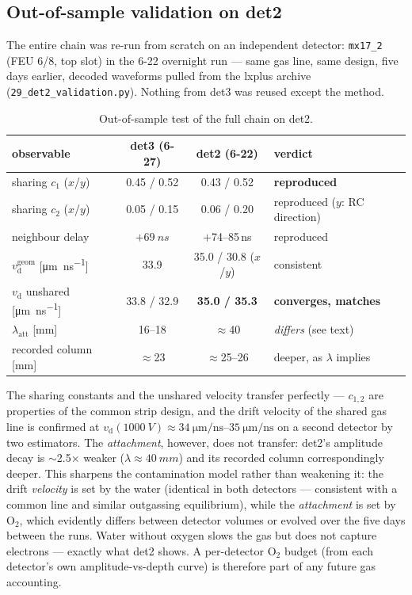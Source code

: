 \documentclass[11pt,a4paper]{article}
\newcommand{\vd}{v_{\mathrm{d}}}
\newcommand{\umns}{\micro\meter\per\nano\second}
\begin{document}
\subsection{Out-of-sample validation on det2}
\label{sec:det2val}

The entire chain was re-run from scratch on an independent detector:
\texttt{mx17\_2} (FEU 6/8, top slot) in the 6-22 overnight run --- same gas
line, same design, five days earlier, decoded waveforms pulled from the
lxplus archive (\texttt{29\_det2\_validation.py}).  Nothing from det3 was
reused except the method.

\begin{table}[H]
\centering\small
\begin{tabular}{lccl}
\toprule
observable & det3 (6-27) & det2 (6-22) & verdict \\
\midrule
sharing $c_1$ ($x$/$y$)      & 0.45 / 0.52 & 0.43 / 0.52 & \textbf{reproduced} \\
sharing $c_2$ ($x$/$y$)      & 0.05 / 0.15 & 0.06 / 0.20 & reproduced ($y$: RC direction) \\
neighbour delay              & $+\SI{69}{ns}$ & $+$74--85\,\si{ns} & reproduced \\
$\vd^{\mathrm{geom}}$ [\si{\umns}] & 33.9 & 35.0 / 30.8 ($x$/$y$) & consistent \\
$\vd$ unshared [\si{\umns}]  & 33.8 / 32.9 & \textbf{35.0 / 35.3} & \textbf{converges, matches} \\
$\lambda_{\mathrm{att}}$ [mm] & 16--18 & $\approx$40 & \emph{differs} (see text) \\
recorded column [mm]         & $\approx$23 & $\approx$25--26 & deeper, as $\lambda$ implies \\
\bottomrule
\end{tabular}
\caption{Out-of-sample test of the full chain on det2.}
\label{tab:det2val}
\end{table}

The sharing constants and the unshared velocity transfer perfectly ---
$c_{1,2}$ are properties of the common strip design, and the drift velocity
of the shared gas line is confirmed at $\vd(\SI{1000}{V}) \approx
\SIrange{34}{35}{\umns}$ on a second detector by two estimators.  The
\emph{attachment}, however, does not transfer: det2's amplitude decay is
$\sim$2.5$\times$ weaker ($\lambda\approx\SI{40}{mm}$) and its recorded
column correspondingly deeper.  This sharpens the contamination model
rather than weakening it: the drift \emph{velocity} is set by the water
(identical in both detectors --- consistent with a common line and similar
outgassing equilibrium), while the \emph{attachment} is set by O$_2$,
which evidently differs between detector volumes or evolved over the five
days between the runs.  Water without oxygen slows the gas but does not
capture electrons --- exactly what det2 shows.  A per-detector O$_2$
budget (from each detector's own amplitude-vs-depth curve) is therefore
part of any future gas accounting.
\end{document}
